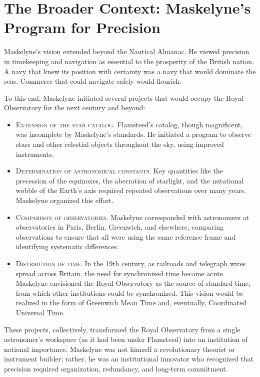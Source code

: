 \section{The Broader Context: Maskelyne's Program for Precision}

Maskelyne's vision extended beyond the Nautical Almanac. He viewed precision in timekeeping and navigation as essential to the prosperity of the British nation. A navy that knew its position with certainty was a navy that would dominate the seas. Commerce that could navigate safely would flourish.

To this end, Maskelyne initiated several projects that would occupy the Royal Observatory for the next century and beyond:

\begin{itemize}

\item \textsc{Extension of the star catalog.} Flamsteed's catalog, though magnificent, was incomplete by Maskelyne's standards. He initiated a program to observe stars and other celestial objects throughout the sky, using improved instruments.

\item \textsc{Determination of astronomical constants.} Key quantities like the precession of the equinoxes, the aberration of starlight, and the nutational wobble of the Earth's axis required repeated observations over many years. Maskelyne organized this effort.

\item \textsc{Comparison of observatories.} Maskelyne corresponded with astronomers at observatories in Paris, Berlin, Greenwich, and elsewhere, comparing observations to ensure that all were using the same reference frame and identifying systematic differences.

\item \textsc{Distribution of time.} In the 19th century, as railroads and telegraph wires spread across Britain, the need for synchronized time became acute. Maskelyne envisioned the Royal Observatory as the source of standard time, from which other institutions could be synchronized. This vision would be realized in the form of Greenwich Mean Time and, eventually, Coordinated Universal Time.

\end{itemize}

These projects, collectively, transformed the Royal Observatory from a single astronomer's workspace (as it had been under Flamsteed) into an institution of national importance. Maskelyne was not himself a revolutionary theorist or instrument builder; rather, he was an institutional innovator who recognized that precision required organization, redundancy, and long-term commitment.

